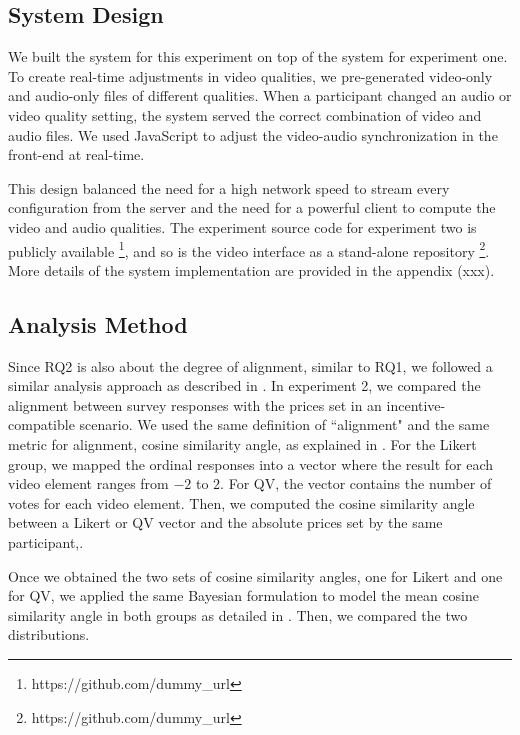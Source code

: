 \subsection{System Design}
We built the system for this experiment on top of the system for experiment one. To create real-time adjustments in video qualities, we pre-generated video-only and audio-only files of different qualities. When a participant changed an audio or video quality setting, the system served the correct combination of video and audio files. We used JavaScript to adjust the video-audio synchronization in the front-end at real-time.

This design balanced the need for a high network speed to stream every configuration from the server and the need for a powerful client to compute the video and audio qualities. The experiment source code for experiment two is publicly available \footnote{https://github.com/dummy\_url}, and so is the video interface as a stand-alone repository \footnote{https://github.com/dummy\_url}. More details of the system implementation are provided in the appendix (xxx).

\subsection{Analysis Method}

Since RQ2 is also about the degree of alignment, similar to RQ1, we followed a similar analysis approach as described in . In experiment 2, we compared the alignment between survey responses with the prices set in an incentive-compatible scenario. We used the same definition of ``alignment" and the same metric for alignment, cosine similarity angle, as explained in . For the Likert group, we mapped the ordinal responses into a vector where the result for each video element ranges from $-2$ to $2$. For QV, the vector contains the number of votes for each video element. Then, we computed the cosine similarity angle between a Likert or QV vector and the absolute prices set by the same participant,.

Once we obtained the two sets of cosine similarity angles, one for Likert and one for QV, we applied the same Bayesian formulation to model the mean cosine similarity angle in both groups as detailed in . Then, we compared the two distributions.